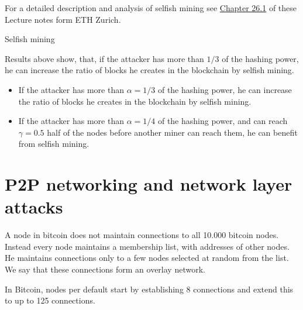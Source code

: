 For a detailed description and analysis of selfish mining see 
 \href{https://disco.ethz.ch/courses/distsys/lnotes/chapter26.pdf}{Chapter 26.1} of these Lecture notes form ETH Zurich.

\begin{algorithm}
	\caption{Selfish mining}
	\begin{algorithmic}
			\EndIf
		\EndIf
	\end{algorithmic}
\end{algorithm}

\begin{note}
Results above show, that, if the attacker has more than $1/3$ of the hashing power, he can increase the ratio of blocks he creates in the blockchain by selfish mining.

\begin{itemize}
	\item If the attacker has more than $\alpha=1/3$ of the hashing power, he can increase the ratio of blocks he creates in the blockchain by selfish mining.
	\item If the attacker has more than $\alpha=1/4$ of the hashing power, and can reach $\gamma=0.5$ half of the nodes before another miner can reach them, he can benefit from selfish mining.
\end{itemize}
\end{note}

\section{P2P networking and network layer attacks}
A node in bitcoin does not maintain connections to all 10.000 bitcoin nodes.
Instead every node maintains a membership list, with addresses of other nodes. He maintains connections only to a few nodes selected at random from the list. 
We say that these connections form an overlay network.

In Bitcoin, nodes per default start by establishing 8 connections and extend this to up to 125 connections.

